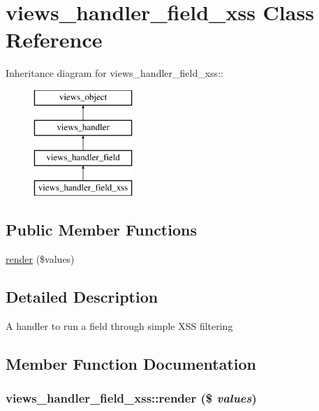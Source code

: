 \hypertarget{classviews__handler__field__xss}{
\section{views\_\-handler\_\-field\_\-xss Class Reference}
\label{classviews__handler__field__xss}
}
Inheritance diagram for views\_\-handler\_\-field\_\-xss::\begin{figure}[H]
\begin{center}
\leavevmode
\includegraphics[height=4cm]{classviews__handler__field__xss}
\end{center}
\end{figure}
\subsection*{Public Member Functions}
\begin{CompactItemize}
\item 
\hyperlink{classviews__handler__field__xss_fbfbc9ee1d2927e22cd5385c5f2fa918}{render} (\$values)
\end{CompactItemize}


\subsection{Detailed Description}
A handler to run a field through simple XSS filtering 

\subsection{Member Function Documentation}
\hypertarget{classviews__handler__field__xss_fbfbc9ee1d2927e22cd5385c5f2fa918}{
\subsubsection[{render}]{\setlength{\rightskip}{0pt plus 5cm}views\_\-handler\_\-field\_\-xss::render (\$ {\em values})}}
\label{classviews__handler__field__xss_fbfbc9ee1d2927e22cd5385c5f2fa918}


